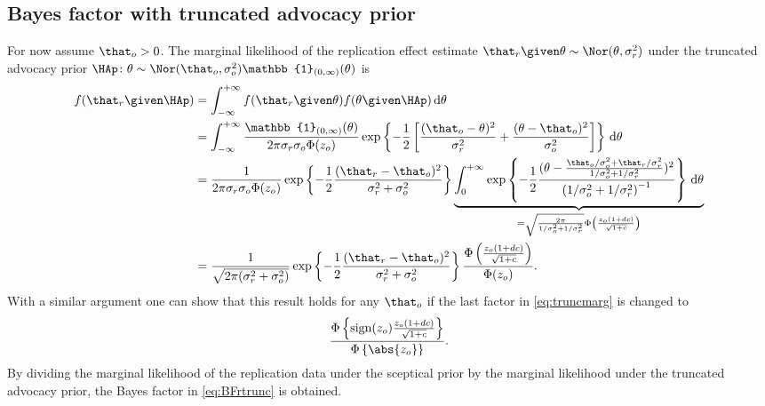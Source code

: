 \begin{subappendices}
\section{Bayes factor with truncated advocacy prior}
\label{app:BFtrunc}
For now assume $\that_o > 0$. The marginal likelihood of the replication effect
estimate $\that_r \given \theta \sim \Nor(\theta, \sigma^2_r)$ under the
truncated advocacy prior
$\HAp \colon \theta \sim \Nor(\that_o, \sigma^2_o) \mathbb{1}_{(0, \infty)}(\theta)$
is
\begin{align}
  f(\that_r \given \HAp)
  &= \int_{-\infty}^{+\infty} f(\that_r \given \theta) f(\theta \given
  \HAp) \, \text{d}\theta \nonumber \\
  &= \int_{-\infty}^{+\infty}
  \frac{\mathbb{1}_{(0, \infty)}(\theta)}{2\pi\sigma_r\sigma_o\Phi(z_o)}
  \exp\left\{-\frac{1}{2}\left[\frac{(\that_o - \theta)^2}{\sigma^2_r}
  + \frac{(\theta - \that_o)^2}{\sigma^2_o}\right]\right\}
  \, \text{d}\theta \nonumber \\
  &=
  \frac{1}{2\pi\sigma_r\sigma_o\Phi(z_o)}
  \exp\left\{-\frac{1}{2}\frac{(\that_r - \that_o)^2}{\sigma^2_r + \sigma^2_o}\right\}
   \underbrace{\int_{0}^{+\infty}
   \exp\left\{-\frac{1}{2}\frac{(\theta - \frac{\that_o/\sigma^2_o +
       \that_r/\sigma^2_r}{1/\sigma^2_o + 1/\sigma^2_r})^2}{\left(
     1/\sigma^2_o + 1/\sigma^2_r\right)^{-1}}\right\}
   \, \text{d}\theta}_{=\sqrt{\frac{2\pi}{1/\sigma^2_o + 1/\sigma^2_r}}
  \Phi\left(\frac{z_o(1 + dc)}{\sqrt{1 + c}}\right)} \nonumber \\
   &= \frac{1}{\sqrt{2\pi(\sigma_r^2 + \sigma_o^2)}}
   \exp\left\{-\frac{1}{2}\frac{(\that_r - \that_o)^2}{\sigma^2_r + \sigma^2_o}
     \right\}  \frac{\Phi\left(\frac{z_o(1 + dc)}{\sqrt{1 + c}}\right)}{
     \Phi(z_o)}.
   \label{eq:truncmarg}
\end{align}
With a similar argument one can show that this result holds for any $\that_o$ if
the last factor in \eqref{eq:truncmarg} is changed to
\begin{align*}
  \frac{\Phi\left\{\text{sign}(z_o) \frac{z_o(1 + dc)}{\sqrt{1 + c}}
  \right\}}{\Phi\left\{\abs{z_o}\right\}}.
\end{align*}
By dividing the marginal likelihood of the replication data under the
sceptical prior by the marginal likelihood under the truncated advocacy prior,
the Bayes factor in \eqref{eq:BFrtrunc} is obtained.



\end{subappendices}
